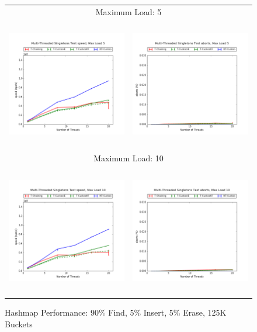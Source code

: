\begin{figure}[h!]
    \centering
    \caption{Hashmap Performance: 90\% Find, 5\% Insert, 5\% Erase, 125K Buckets}
    \begin{tabular}{|cc|}
        \hline 
        \multicolumn{2}{|c|}{{\footnotesize Maximum Load: 5}}\\
        \includegraphics[height=2.25in]{maps/5HM125K:F90,I5,E5speed.png} &
        \includegraphics[height=2.25in]{maps/5HM125K:F90,I5,E5aborts.png}\\
        \hline 
        \multicolumn{2}{|c|}{{\footnotesize Maximum Load: 10}}\\
        \includegraphics[height=2.25in]{maps/10HM125K:F90,I5,E5speed.png} &
        \includegraphics[height=2.25in]{maps/10HM125K:F90,I5,E5aborts.png}\\

\end{tabular}
\end{figure}
